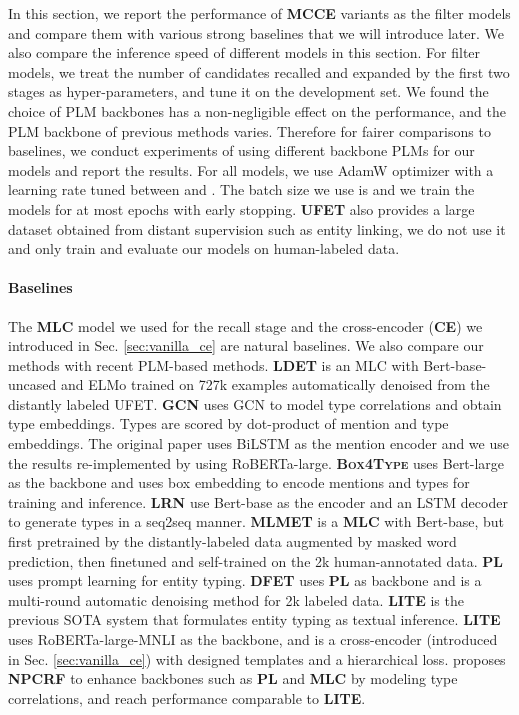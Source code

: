 \documentclass[11pt]{article}
\begin{document}
In this section, we report the performance of {\bf \textsc{MCCE}} variants as the filter models and compare them with various strong baselines that we will introduce later. We also compare the inference speed of different models in this section. For filter models, we treat the number of candidates  recalled and expanded by the first two stages as hyper-parameters, and tune it on the development set. We found the choice of PLM backbones has a non-negligible effect on the performance, and the PLM backbone of previous methods varies. Therefore for fairer comparisons to baselines, we conduct experiments of {\bf \textsc{\name}} using different backbone PLMs for our {\bf \textsc{\name}} models and report the results. For all {\bf \textsc{\name}} models, we use AdamW optimizer with a learning rate tuned between  and . The batch size we use is  and we train the models for at most  epochs with early stopping. {\bf \textsc{UFET}} also provides a large dataset obtained from distant supervision such as entity linking, we do not use it and only train and evaluate our models on human-labeled data.
\paragraph{Baselines}
The {\bf \textsc{MLC}} model we used for the recall stage and the cross-encoder ({\bf \textsc{CE}}) we introduced in Sec. \ref{sec:vanilla_ce} are natural baselines. We also compare our methods with recent PLM-based methods. {\bf \textsc{LDET} }\cite{onoe-durrett-2019-learning} is an MLC with Bert-base-uncased and ELMo \cite{elmo} trained on 727k examples automatically denoised from the distantly labeled UFET. {\bf \textsc{GCN} }\cite{xiong-etal-2019-imposing} uses GCN to model type correlations and obtain type embeddings. Types are scored by dot-product of mention and type embeddings. The original paper uses BiLSTM as the mention encoder and we use the results re-implemented by \citet{npcrf} using RoBERTa-large. {\bf \textsc{Box4Type} }\cite{box4types} uses Bert-large as the backbone and uses box embedding to encode mentions and types for training and inference. {\bf \textsc{LRN} }\cite{liu-etal-2021-fine} use Bert-base as the encoder and an LSTM decoder to generate types in a seq2seq manner. {\bf \textsc{MLMET} }\cite{mlmet} is a {\bf \textsc{MLC}} with Bert-base, but first pretrained by the distantly-labeled data augmented by masked word prediction, then finetuned and self-trained on the 2k human-annotated data. {\bf \textsc{PL}} \cite{ding2021prompt} uses prompt learning for entity typing. {\bf \textsc{DFET} }\cite{dfet} uses {\bf \textsc{PL}} as backbone and is a multi-round automatic denoising method for 2k labeled data. {\bf \textsc{LITE} }\cite{lite} is the previous SOTA system that formulates entity typing as textual inference. {\bf \textsc{LITE}} uses RoBERTa-large-MNLI as the backbone, and is a cross-encoder (introduced in Sec. \ref{sec:vanilla_ce}) with designed templates and a hierarchical loss. \citet{npcrf} proposes {\bf \textsc{NPCRF}} to enhance backbones such as {\bf \textsc{PL}} and {\bf \textsc{MLC}} by modeling type correlations, and reach performance comparable to {\bf \textsc{LITE}}.
\end{document}
